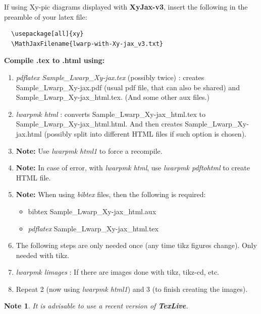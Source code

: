 \documentclass[a4paper,12pt]{article}
\newtheorem*{Note}{Note}
\newtheorem{Fundamental Theorem}{Fundamental Theorem}
\begin{document}
\bigskip

 If using Xy-pic diagrams displayed with {\textbf{XyJax-v3}}, insert the following in the preamble of your latex file:
\begin{verbatim}
  \usepackage[all]{xy}
  \MathJaxFilename{lwarp-with-Xy-jax_v3.txt}
\end{verbatim}


\textbf{Compile .tex to .html using:}

\begin{enumerate}
 \item  \emph{pdflatex Sample\_Lwarp\_Xy-jax.tex} (possibly twice) : creates Sample\_Lwarp\_Xy-jax.pdf  (usual pdf file, that can also be shared) and Sample\_Lwarp\_Xy-jax\_html.tex. (And some other aux files.)
\item  \emph{lwarpmk html} : converts Sample\_Lwarp\_Xy-jax\_html.tex  to Sample\_Lwarp\_Xy-jax\_html.html. And then creates Sample\_Lwarp\_Xy-jax.html (possibly split into different HTML files if such option is chosen).
\item[] \qquad \textbf{Note:} Use \emph{lwarpmk html1} to force a recompile.
\item[] \qquad \textbf{Note:} In case of error, with \emph{lwarpmk html}, use \emph{lwarpmk pdftohtml} to create HTML file.
\item[] \qquad \textbf{Note:} When using \emph{bibtex} files, then the following is required:  \begin{itemize}\item  bibtex  {Sample\_Lwarp\_Xy-jax\_html.aux} \item \emph{pdflatex} Sample\_Lwarp\_Xy-jax\_html.tex\end{itemize}

\item[] The following steps are only needed once (any time tikz figures change). Only needed with tikz.
\item  \emph{lwarpmk limages}  : If there are images done with tikz, tikz-cd, etc.
\item  Repeat 2 (now using \emph{lwarpmk html1}) and 3 (to finish creating the images).
\end{enumerate}
\begin{Note}It is advisable to use a recent version of \emph{\textbf{TexLive}.}\end{Note}
\end{document}
